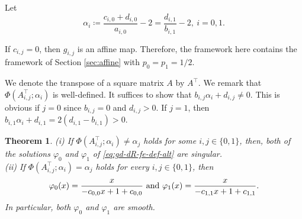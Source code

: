\documentclass[a4paper, reqno, 11pt]{amsart}
\newtheorem{Thm}{Theorem}[section]
\theoremstyle{definition}
\begin{document}
Let 
\begin{equation}\label{eq:def-alpha} 
\alpha_i \coloneqq \frac{c_{i,0} + d_{i,0}}{a_{i,0}} - 2 = \frac{d_{i,1}}{b_{i,1}} - 2, \ i = 0,1. 
\end{equation} 

If $c_{i,j} = 0$, then $g_{i,j}$ is an affine map. 
Therefore, the framework here contains the framework of Section \ref{sec:affine} with $p_0 = p_1 = 1/2$. 

We denote the transpose of a square matrix $A$ by $A^{\top}$. 
We remark that $\Phi \left(A_{i,j}^{\top}; \alpha_i \right)$ is well-defined. 
It suffices to show that $b_{i,j} \alpha_i + d_{i,j} \ne 0$. 
This is obvious if $j=0$ since $b_{i,j} = 0$ and $d_{i,j} > 0$.
If $j=1$, then $b_{i,1} \alpha_i + d_{i,1} = 2(d_{i,1} - b_{i,1}) > 0$. 

\begin{Thm}\label{thm:LF}
(i) If $\Phi \left(A_{i,j}^{\top}; \alpha_i \right) \ne \alpha_j$ holds for some $i, j \in \{0,1\}$, 
then, both of the solutions $\varphi_0$ and $\varphi_1$ of  \eqref{eq:gd-dR-fe-def-alt} are singular.\\
(ii) If $\Phi \left(A_{i,j}^{\top}; \alpha_i \right) = \alpha_j$ holds for every $i, j \in \{0,1\}$, 
then 
\begin{equation}\label{eq:solution-ac} 
\varphi_0 (x) = \frac{x}{-c_{0,0} x + 1 + c_{0,0}} \textup{ and } \varphi_1 (x) = \frac{x}{-c_{1,1} x + 1 + c_{1,1}}. 
\end{equation}
In particular, both $\varphi_0$ and $\varphi_1$ are smooth. 
\end{Thm}
\end{document}
